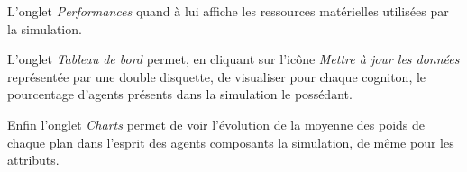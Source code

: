 L'onglet \textit{Performances} quand à lui affiche les ressources matérielles utilisées par la simulation.

L'onglet \textit{Tableau de bord} permet, en cliquant sur l'icône \textit{Mettre à jour les données} représentée par une double disquette, de visualiser pour chaque cogniton, le pourcentage d'agents présents dans la simulation le possédant. 

Enfin l'onglet \textit{Charts} permet de voir l'évolution de la moyenne des poids de chaque plan dans l'esprit des agents composants la simulation, de même pour les attributs.

